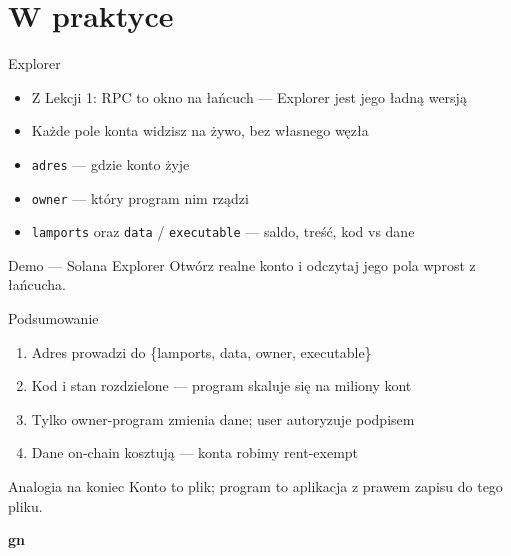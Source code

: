 \section{W praktyce}

\begin{frame}{Explorer}
  \begin{itemize}
    \item Z Lekcji 1: RPC to okno na łańcuch --- Explorer jest jego ładną wersją
    \item Każde pole konta widzisz na żywo, bez własnego węzła
    \item \texttt{adres} --- gdzie konto żyje
    \item \texttt{owner} --- który program nim rządzi
    \item \texttt{lamports} oraz \texttt{data} / \texttt{executable} --- saldo, treść, kod vs dane
  \end{itemize}
  \vspace{0.25cm}
  \begin{exampleblock}{Demo --- Solana Explorer}
    Otwórz realne konto i odczytaj jego pola wprost z łańcucha.
  \end{exampleblock}
\end{frame}

\begin{frame}{Podsumowanie}
  \begin{enumerate}
    \item Adres prowadzi do \{lamports, data, owner, executable\}
    \item Kod i stan rozdzielone --- program skaluje się na miliony kont
    \item Tylko owner-program zmienia dane; user autoryzuje podpisem
    \item Dane on-chain kosztują --- konta robimy rent-exempt
  \end{enumerate}
  \vspace{0.2cm}
  \begin{exampleblock}{Analogia na koniec}
    Konto to plik; program to aplikacja z prawem zapisu do tego pliku.
  \end{exampleblock}
\end{frame}

\begin{frame}[plain]
  \begin{center}
    \vfill
    {\Huge\bfseries\color{stplwhite} gn}
    \vfill
  \end{center}
\end{frame}


